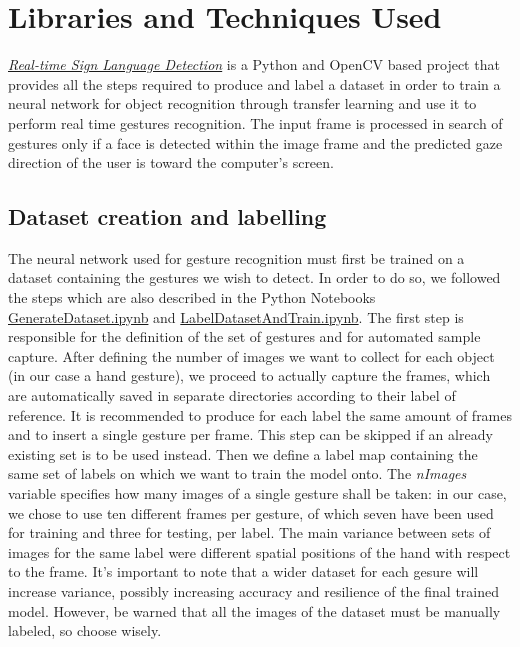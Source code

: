 \documentclass[a4paper, 12pt]{article}
\begin{document}
\section{Libraries and Techniques Used}
\label{LibsAndTech}
\textit{\hyperref[https://github.com/MarzioVallero/Real-time-Sign-Language-Detection]{Real-time Sign Language Detection}} is a Python and OpenCV based project that provides all the steps required to produce and label a dataset in order to train a neural network for object recognition through transfer learning and use it to perform real time gestures recognition.
The input frame is processed in search of gestures only if a face is detected within the image frame and the predicted gaze direction of the user is toward the computer's screen.\linebreak

\subsection{Dataset creation and labelling}
\label{DatasetCreationLabel}
The neural network used for gesture recognition must first be trained on a dataset containing the gestures we wish to detect.
In order to do so, we followed the steps which are also described in the Python Notebooks \href{https://github.com/MarzioVallero/Real-time-Sign-Language-Detection/blob/master/GenerateDataset.ipynb}{GenerateDataset.ipynb} and \href{https://github.com/MarzioVallero/Real-time-Sign-Language-Detection/blob/master/LabelDatasetAndTrain.ipynb}{LabelDatasetAndTrain.ipynb}.\linebreak
The first step is responsible for the definition of the set of gestures and for automated sample capture. After defining the number of images we want to collect for each object (in our case a hand gesture), we proceed to actually capture the frames, which are automatically saved in separate directories according to their label of reference. It is recommended to produce for each label the same amount of frames and to insert a single gesture per frame. This step can be skipped if an already existing set is to be used instead.\linebreak
Then we define a label map containing the same set of labels on which we want to train the model onto.
The \textit{nImages} variable specifies how many images of a single gesture shall be taken: in our case, we chose to use ten different frames per gesture, of which seven have been used for training and three for testing, per label.
The main variance between sets of images for the same label were different spatial positions of the hand with respect to the frame.\linebreak
It's important to note that a wider dataset for each gesure will increase variance, possibly increasing accuracy and resilience of the final trained model. However, be warned that all the images of the dataset must be manually labeled, so choose wisely.
\end{document}
